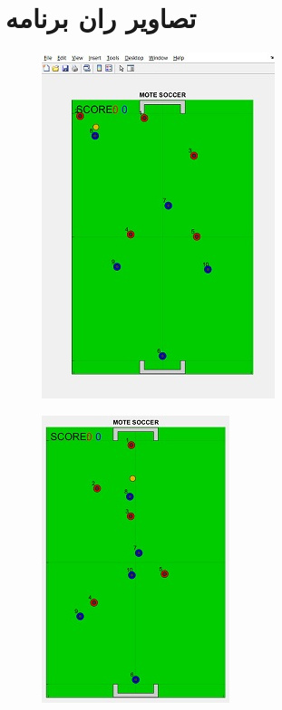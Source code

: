 \newpage

\section*{تصاویر ران برنامه}

\begin{figure}[H]
	\centering
	\includegraphics{6.jpg}
	\label{fig:label4}
\end{figure}

\begin{figure}[H]
	\centering
	\includegraphics{7.jpg}
	\label{fig:label4}
\end{figure}


